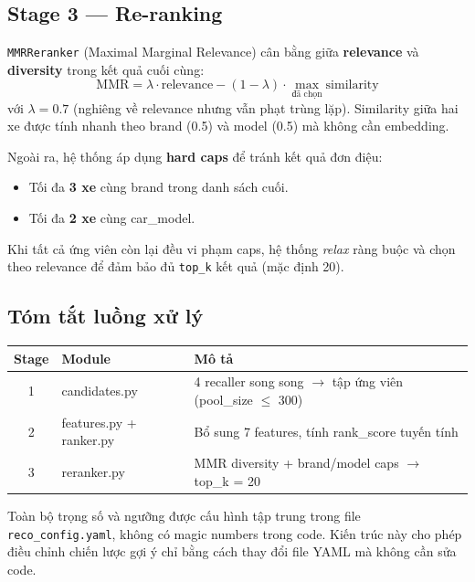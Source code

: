 \subsection{Stage 3 — Re-ranking}

\texttt{MMRReranker} (Maximal Marginal Relevance) cân bằng giữa \textbf{relevance} và \textbf{diversity} trong kết quả cuối cùng:
\[
\text{MMR} = \lambda \cdot \text{relevance} - (1 - \lambda) \cdot \max_{\text{đã chọn}} \text{similarity}
\]
với $\lambda = 0.7$ (nghiêng về relevance nhưng vẫn phạt trùng lặp). Similarity giữa hai xe được tính nhanh theo brand (0.5) và model (0.5) mà không cần embedding.

Ngoài ra, hệ thống áp dụng \textbf{hard caps} để tránh kết quả đơn điệu:
\begin{itemize}
    \item Tối đa \textbf{3 xe} cùng brand trong danh sách cuối.
    \item Tối đa \textbf{2 xe} cùng car\_model.
\end{itemize}

Khi tất cả ứng viên còn lại đều vi phạm caps, hệ thống \textit{relax} ràng buộc và chọn theo relevance để đảm bảo đủ \texttt{top\_k} kết quả (mặc định 20).

\subsection{Tóm tắt luồng xử lý}

\begin{center}
\small
\begin{tabular}{|c|l|l|}
\hline
\textbf{Stage} & \textbf{Module} & \textbf{Mô tả} \\
\hline
1 & candidates.py & 4 recaller song song $\rightarrow$ tập ứng viên (pool\_size $\leq$ 300) \\
\hline
2 & features.py + ranker.py & Bổ sung 7 features, tính rank\_score tuyến tính \\
\hline
3 & reranker.py & MMR diversity + brand/model caps $\rightarrow$ top\_k = 20 \\
\hline
\end{tabular}
\end{center}

Toàn bộ trọng số và ngưỡng được cấu hình tập trung trong file \texttt{reco\_config.yaml}, không có magic numbers trong code. Kiến trúc này cho phép điều chỉnh chiến lược gợi ý chỉ bằng cách thay đổi file YAML mà không cần sửa code.

